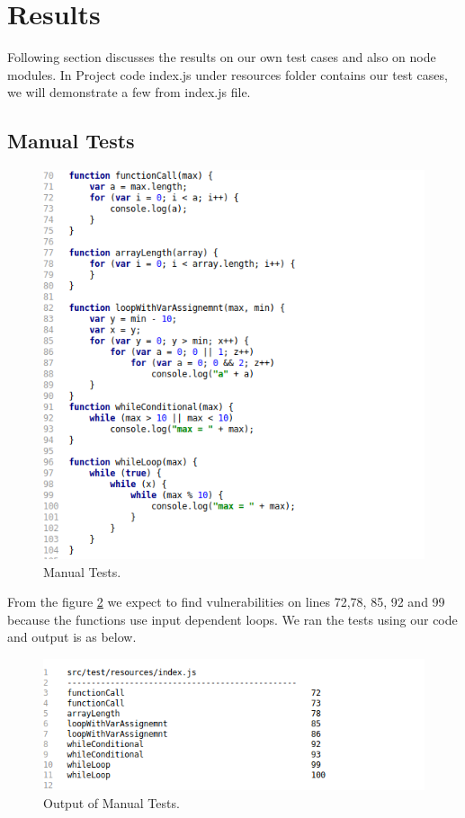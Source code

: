 \documentclass[authoryear,preprint]{sigplanconf}
\begin{document}
\section{Results}
Following section discusses the results on our own test cases and also on node modules.
In Project code index.js under resources folder contains our test cases, we will demonstrate a few from index.js file.

\subsection{Manual Tests}
\begin{figure}[ht]
\centering
\includegraphics[width=1\linewidth]{figures/testcases}
\caption[Manual Tests]{\label{f:testcases}Manual Tests.}
\end{figure}

From the figure \ref{f:testcases} we expect to find vulnerabilities on lines 72,78, 85, 92 and 99 because the functions use input dependent loops.
We ran the tests using our code and output is as below.

\begin{figure}[ht]
\centering
\includegraphics[width=1\linewidth]{figures/output}
\caption[Output of Manual Tests]{\label{f:testcases}Output of Manual Tests.}
\end{figure}
\end{document}

